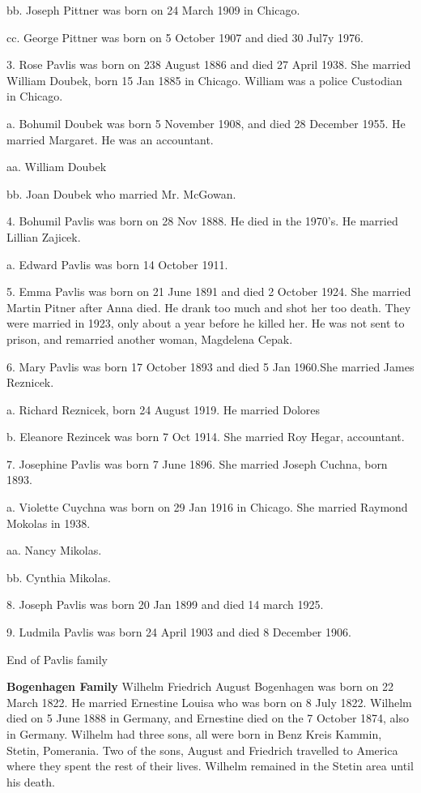 \documentclass[a4paper]{article}
\begin{document}
bb. Joseph Pittner was born on 24 March 1909 in Chicago.

cc. George Pittner was born on 5 October 1907 and died 30 Jul7y 1976.

3. Rose Pavlis was born on 238 August 1886 and died 27 April 1938.  She married William Doubek, born 15 Jan 1885 in Chicago.  William was a police Custodian in Chicago.  

a. Bohumil Doubek was born 5 November 1908, and died 28 December 1955.  He married Margaret.  He was an accountant.

aa. William Doubek

bb. Joan Doubek who married Mr. McGowan.

4. Bohumil Pavlis was born on 28 Nov 1888.  He died in the 1970's. He married Lillian Zajicek.  

a. Edward Pavlis was born 14 October 1911.  

5. Emma Pavlis was born on 21 June 1891 and died 2 October 1924.  She married Martin Pitner after Anna died.  He drank too much and shot her too death. They were married in 1923, only about a year before he killed her.  He was not sent to prison, and remarried another woman, Magdelena Cepak.  

6. Mary Pavlis was born 17 October 1893 and died 5 Jan 1960.She married James Reznicek.

a. Richard Reznicek, born 24 August 1919.  He married Dolores

b. Eleanore Rezincek was born 7 Oct 1914.  She married Roy Hegar, accountant.

7. Josephine Pavlis was born 7 June 1896.  She married Joseph Cuchna, born 1893.  

a. Violette Cuychna was born on 29 Jan 1916 in Chicago.  She married Raymond Mokolas in 1938.

aa. Nancy Mikolas.

bb. Cynthia Mikolas.

8. Joseph Pavlis was born 20 Jan 1899 and died 14 march 1925.

9. Ludmila Pavlis was born 24 April 1903 and died 8 December 1906.  

\vskip 4mm
End of Pavlis family
\pagebreak

{\noindent \Huge \bf Bogenhagen Family}
\vskip 6mm
	Wilhelm Friedrich August Bogenhagen was born on 22 March 1822.  He married Ernestine Louisa who was born on 8 July 1822.  Wilhelm died on 5 June 1888 in Germany, and Ernestine died on the 7 October 1874, also in Germany.  Wilhelm had three sons, all were born in Benz Kreis Kammin, Stetin, Pomerania.   Two of the sons, August and Friedrich travelled to America where they spent the rest of their lives. Wilhelm remained in the Stetin area until his death.
\end{document}

